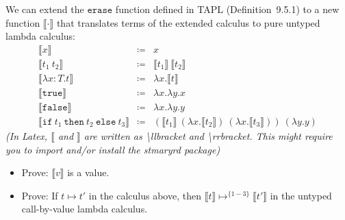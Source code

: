 We can extend the $\mathtt{erase}$ function defined in TAPL (Definition~9.5.1) to a new function $\llbracket\cdot\rrbracket$
that translates terms of the extended calculus to pure untyped lambda calculus: 
\begin{align*}
  \llbracket x \rrbracket &\coloneq & x \\
  \llbracket t_1~t_2 \rrbracket &\coloneq&  \llbracket t_1 \rrbracket~\llbracket t_2 \rrbracket \\
  \llbracket \lambda x:T . t \rrbracket &\coloneq& \lambda x. \llbracket t \rrbracket \\
  \llbracket \mathtt{true}\rrbracket &\coloneq& \lambda{x}.\lambda{y}.x \\
  \llbracket \mathtt{false}\rrbracket &\coloneq& \lambda{x}.\lambda{y}.y \\
  \llbracket \mathtt{if}~t_1~\mathtt{then}~t_2~\mathtt{else}~t_3 \rrbracket &\coloneq& (\llbracket t_1 \rrbracket~(\lambda{x}.\llbracket t_2 \rrbracket)~(\lambda{x}.\llbracket t_3 \rrbracket))~(\lambda{y}.y)
\end{align*}
\emph{(In Latex, $\llbracket$ and $\rrbracket$ are written as \textbackslash llbracket and \textbackslash rrbracket. 
This might require you to import and/or install the stmaryrd package)}

\begin{itemize}
  \item Prove: $\llbracket v \rrbracket$ is a value.
  \item Prove: If $t \mapsto t'$ in the calculus above, then $\llbracket t\rrbracket \mapsto^{\{1-3\}} \llbracket t'\rrbracket$
      in the untyped call-by-value lambda calculus.
\end{itemize}

